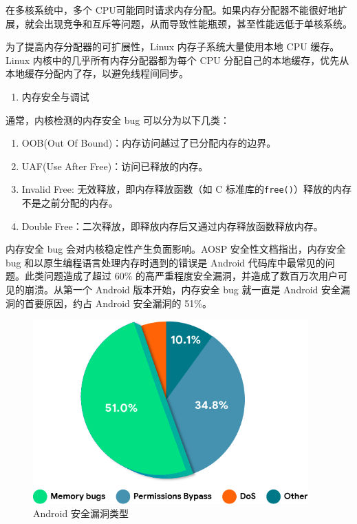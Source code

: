 \documentclass[AutoFakeBold]{LZUThesis}
\newcommand{\tightlist}{%
  \setlength{\itemsep}{0pt}\setlength{\parskip}{0pt}}
\begin{document}
\begin{sloppypar}
在多核系统中，多个 CPU可能同时请求内存分配。如果内存分配器不能很好地扩展，就会出现竞争和互斥等问题，从而导致性能瓶颈，甚至性能远低于单核系统。

为了提高内存分配器的可扩展性，Linux 内存子系统大量使用本地 CPU
缓存。Linux 内核中的几乎所有内存分配器都为每个 CPU
分配自己的本地缓存，优先从本地缓存分配内了存，以避免线程间同步。

\begin{enumerate}
\def\labelenumi{\arabic{enumi}.}
\setcounter{enumi}{3}
\tightlist
\item
  内存安全与调试
\end{enumerate}

通常，内核检测的内存安全 bug 可以分为以下几类：

\begin{enumerate}
\def\labelenumi{\arabic{enumi}.}
\item
  OOB(Out Of Bound)：内存访问越过了已分配内存的边界。
\item
  UAF(Use After Free)：访问已释放的内存。
\item
  Invalid Free: 无效释放，即内存释放函数（如 C
  标准库的\texttt{free()}）释放的内存不是之前分配的内存。
\item
  Double Free：二次释放，即释放内存后又通过内存释放函数释放内存。
\end{enumerate}

内存安全 bug
会对内核稳定性产生负面影响。AOSP
安全性文档指出，内存安全 bug 和以原生编程语言处理内存时遇到的错误是 Android 代码库中最常见的问题。此类问题造成了超过 60\% 的高严重程度安全漏洞，并造成了数百万次用户可见的崩溃。从第一个 Android
版本开始，内存安全 bug 就一直是 Android 安全漏洞的首要原因，约占 Android
安全漏洞的 51\%。

\begin{figure}[htb]
\centering
\includegraphics[width=300pt]{images/Android-security-report.png}
\caption{Android 安全漏洞类型}
\end{figure}


\end{sloppypar}
\end{document}
